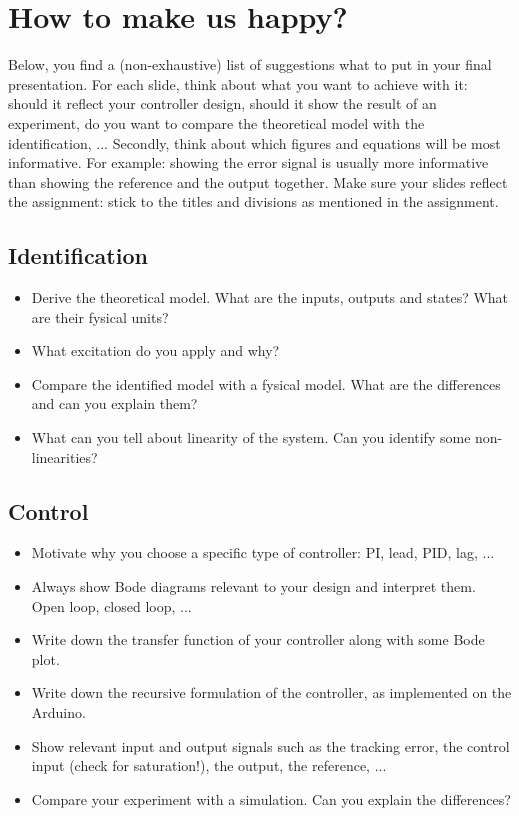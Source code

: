 \documentclass[10pt,a4paper]{article}
\begin{document}
\section{How to make us happy?}
Below, you find a (non-exhaustive) list of suggestions what to put in your final presentation. For each slide, think about what you want to achieve with it: should it reflect your controller design, should it show the result of an experiment, do you want to compare the theoretical model with the identification, ... Secondly, think about which figures and equations will be most informative. For example: showing the error signal is usually more informative than showing the reference and the output together. Make sure your slides reflect the assignment: stick to the titles and divisions as mentioned in the assignment.

\subsection{Identification}
\begin{itemize}
\item Derive the theoretical model. What are the inputs, outputs and states? What are their fysical units?
\item What excitation do you apply and why?
\item Compare the identified model with a fysical model. What are the differences and can you explain them?
\item What can you tell about linearity of the system. Can you identify some non-linearities?
\end{itemize}

\subsection{Control}
\begin{itemize}
\item Motivate why you choose a specific type of controller: PI, lead, PID, lag, ...
\item Always show Bode diagrams relevant to your design and interpret them. Open loop, closed loop, ...
\item Write down the transfer function of your controller along with some Bode plot.
\item Write down the recursive formulation of the controller, as implemented on the Arduino.
\item Show relevant input and output signals such as the tracking error, the control input (check for saturation!), the output, the reference, ...
\item Compare your experiment with a simulation. Can you explain the differences?
\end{itemize}
\end{document}
